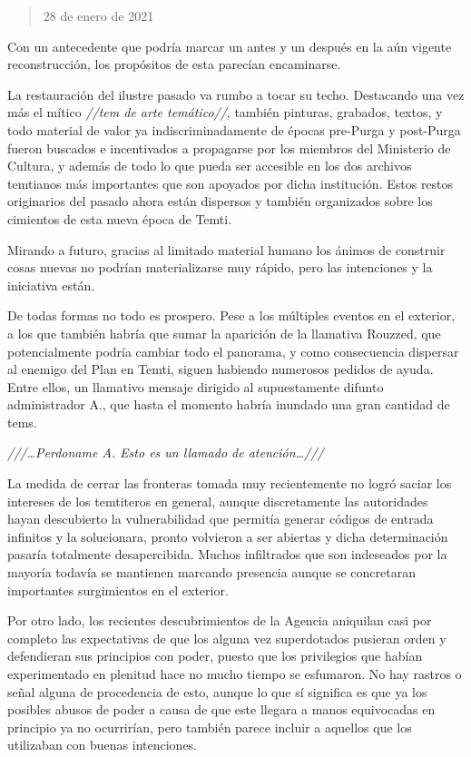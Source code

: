 \documentclass[
  spanish,
]{book}
\begin{document}
\begin{quote}
28 de enero de 2021
\end{quote}

Con un antecedente que podría marcar un antes y un después en la aún vigente reconstrucción, los propósitos de esta parecían encaminarse.

La restauración del ilustre pasado va rumbo a tocar su techo. Destacando una vez más el mítico \emph{//tem de arte temático//}, también pinturas, grabados, textos, y todo material de valor ya indiscriminadamente de épocas pre-Purga y post-Purga fueron buscados e incentivados a propagarse por los miembros del Ministerio de Cultura, y además de todo lo que pueda ser accesible en los dos archivos temtianos más importantes que son apoyados por dicha institución. Estos restos originarios del pasado ahora están dispersos y también organizados sobre los cimientos de esta nueva época de Temti.

Mirando a futuro, gracias al limitado material humano los ánimos de construir cosas nuevas no podrían materializarse muy rápido, pero las intenciones y la iniciativa están.

De todas formas no todo es prospero. Pese a los múltiples eventos en el exterior, a los que también habría que sumar la aparición de la llamativa Rouzzed, que potencialmente podría cambiar todo el panorama, y como consecuencia dispersar al enemigo del Plan en Temti, siguen habiendo numerosos pedidos de ayuda. Entre ellos, un llamativo mensaje dirigido al supuestamente difunto administrador A., que hasta el momento habría inundado una gran cantidad de tems.

\emph{///\ldots Perdoname A. Esto es un llamado de atención\ldots///}

La medida de cerrar las fronteras tomada muy recientemente no logró saciar los intereses de los temtiteros en general, aunque discretamente las autoridades hayan descubierto la vulnerabilidad que permitía generar códigos de entrada infinitos y la solucionara, pronto volvieron a ser abiertas y dicha determinación pasaría totalmente desapercibida. Muchos infiltrados que son indeseados por la mayoría todavía se mantienen marcando presencia aunque se concretaran importantes surgimientos en el exterior.

Por otro lado, los recientes descubrimientos de la Agencia aniquilan casi por completo las expectativas de que los alguna vez superdotados pusieran orden y defendieran sus principios con poder, puesto que los privilegios que habían experimentado en plenitud hace no mucho tiempo se esfumaron. No hay rastros o señal alguna de procedencia de esto, aunque lo que sí significa es que ya los posibles abusos de poder a causa de que este llegara a manos equivocadas en principio ya no ocurrirían, pero también parece incluir a aquellos que los utilizaban con buenas intenciones.
\end{document}

